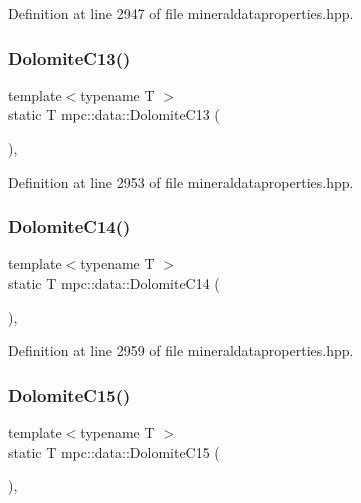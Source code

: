 Definition at line 2947 of file mineraldataproperties.\+hpp.

\mbox{\label{namespacempc_1_1data_a3ed324e37c29fe212035c94372e6aacd}} 
\subsubsection{\texorpdfstring{Dolomite\+C13()}{DolomiteC13()}}
{\footnotesize\ttfamily template$<$typename T $>$ \\
static T mpc\+::data\+::\+Dolomite\+C13 (\begin{DoxyParamCaption}{ }\end{DoxyParamCaption})\hspace{0.3cm}{\ttfamily [inline]}, {\ttfamily [static]}}



Definition at line 2953 of file mineraldataproperties.\+hpp.

\mbox{\label{namespacempc_1_1data_afb2df6dec5818bb54688e66b04e4612a}} 
\subsubsection{\texorpdfstring{Dolomite\+C14()}{DolomiteC14()}}
{\footnotesize\ttfamily template$<$typename T $>$ \\
static T mpc\+::data\+::\+Dolomite\+C14 (\begin{DoxyParamCaption}{ }\end{DoxyParamCaption})\hspace{0.3cm}{\ttfamily [inline]}, {\ttfamily [static]}}



Definition at line 2959 of file mineraldataproperties.\+hpp.

\mbox{\label{namespacempc_1_1data_a19061414cd5851d6f1466fbf6f80d949}} 
\subsubsection{\texorpdfstring{Dolomite\+C15()}{DolomiteC15()}}
{\footnotesize\ttfamily template$<$typename T $>$ \\
static T mpc\+::data\+::\+Dolomite\+C15 (\begin{DoxyParamCaption}{ }\end{DoxyParamCaption})\hspace{0.3cm}{\ttfamily [inline]}, {\ttfamily [static]}}



